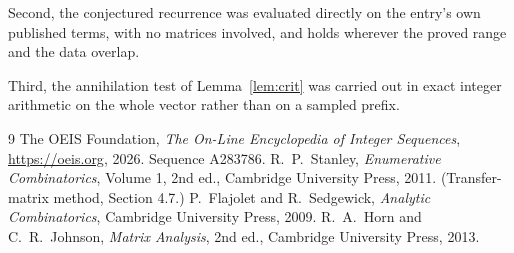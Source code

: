\documentclass[11pt,a4paper]{article}
\theoremstyle{plain}
\theoremstyle{definition}
\begin{document}
Second, the conjectured recurrence was evaluated directly on the entry's own published terms,
with no matrices involved, and holds wherever the proved range and the data overlap.

Third, the annihilation test of Lemma~\ref{lem:crit} was carried out in exact integer
arithmetic on the whole vector rather than on a sampled prefix.

\begin{thebibliography}{9}
 The OEIS Foundation, \emph{The On-Line Encyclopedia of Integer
Sequences}, \url{https://oeis.org}, 2026. Sequence A283786.
 R.~P.~Stanley, \emph{Enumerative Combinatorics}, Volume 1, 2nd ed.,
Cambridge University Press, 2011. (Transfer-matrix method, Section 4.7.)
 P.~Flajolet and R.~Sedgewick, \emph{Analytic Combinatorics}, Cambridge
University Press, 2009.
 R.~A.~Horn and C.~R.~Johnson, \emph{Matrix Analysis}, 2nd ed., Cambridge
University Press, 2013.
\end{thebibliography}
\end{document}
